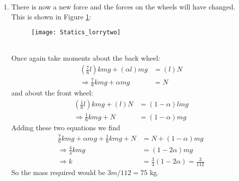 \begin{problem}
{\begin{enumerate}
\begin{align*}
(l)R_F&=(\alpha l)mg \\
\Rightarrow \alpha&=\frac{R_F}{mg}=\frac{27}{56}
\end{align*}
So the distance from the front axle is
\begin{align*}
(1-\alpha)l&=(1-\frac{27}{56})3=1.55\textrm{ m}
\end{align*}
\item There is now a new force and the forces on the wheels will have changed. This is shown in Figure \ref{fig:Statics_lorrytwo}:
\begin{figure}[h]
\centering
\texttt{[image: Statics\_lorrytwo]}
\caption{}
\label{fig:Statics_lorrytwo}
\end{figure}
\\
Once again take moments about the back wheel:
\begin{align*}
\left(\frac{7}{6}l\right)kmg+(\alpha l)mg&=(l)N \\
\Rightarrow \frac{7}{6}kmg+\alpha mg&=N
\end{align*}
and about the front wheel:
\begin{align*}
\left(\frac{1}{6}l\right)kmg+(l)N&=(1-\alpha)lmg \\
\Rightarrow \frac{1}{6}kmg+N&=(1-\alpha)mg
\end{align*}
Adding these two equations we find
\begin{align*}
\frac{7}{6}kmg+\alpha mg+\frac{1}{6}kmg+N&=N+(1-\alpha)mg \\
\Rightarrow \frac{4}{3}kmg&=(1-2\alpha)mg \\
\Rightarrow k&=\frac{3}{4}(1-2\alpha)=\frac{3}{112}
\end{align*}
So the mass required would be $3m/112=75$ kg.
\end{enumerate}
}
\end{problem}